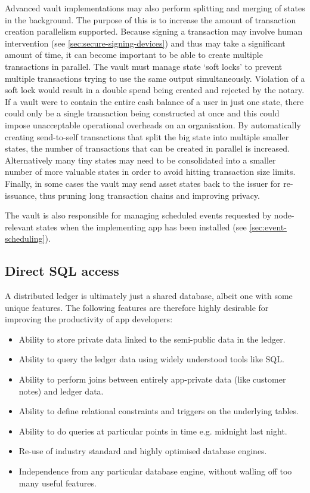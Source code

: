 \documentclass{article}
\begin{document}
Advanced vault implementations may also perform splitting and merging of states in the background. The purpose of this
is to increase the amount of transaction creation parallelism supported. Because signing a transaction may involve
human intervention (see \cref{sec:secure-signing-devices}) and thus may take a significant amount of time, it can
become important to be able to create multiple transactions in parallel. The vault must manage state `soft locks' to
prevent multiple transactions trying to use the same output simultaneously. Violation of a soft lock would result in
a double spend being created and rejected by the notary. If a vault were to contain the entire cash balance
of a user in just one state, there could only be a single transaction being constructed at once and this could
impose unacceptable operational overheads on an organisation. By automatically creating send-to-self transactions that
split the big state into multiple smaller states, the number of transactions that can be created in parallel is
increased. Alternatively many tiny states may need to be consolidated into a smaller number of more valuable states
in order to avoid hitting transaction size limits. Finally, in some cases the vault may send asset states back
to the issuer for re-issuance, thus pruning long transaction chains and improving privacy.

The vault is also responsible for managing scheduled events requested by node-relevant states when the implementing app
has been installed (see \cref{sec:event-scheduling}).

\subsection{Direct SQL access}

A distributed ledger is ultimately just a shared database, albeit one with some unique features. The following features
are therefore highly desirable for improving the productivity of app developers:

\begin{itemize}
\item Ability to store private data linked to the semi-public data in the ledger.
\item Ability to query the ledger data using widely understood tools like SQL.
\item Ability to perform joins between entirely app-private data (like customer notes) and ledger data.
\item Ability to define relational constraints and triggers on the underlying tables.
\item Ability to do queries at particular points in time e.g. midnight last night.
\item Re-use of industry standard and highly optimised database engines.
\item Independence from any particular database engine, without walling off too many useful features.
\end{itemize}
\end{document}

